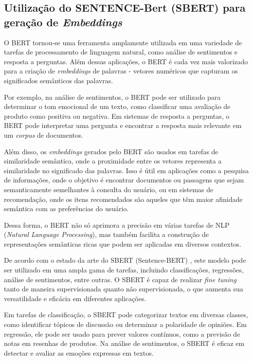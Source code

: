 \subsection{Utilização do SENTENCE-Bert (SBERT) para geração de \textit{Embeddings}}

O BERT tornou-se uma ferramenta amplamente utilizada em uma variedade de tarefas de processamento de linguagem natural, como análise de sentimentos e resposta a perguntas. Além dessas aplicações, o BERT é cada vez mais valorizado para a criação de \textit{embeddings} de palavras - vetores numéricos que capturam os significados semânticos das palavras.

Por exemplo, na análise de sentimentos, o BERT pode ser utilizado para determinar o tom emocional de um texto, como classificar uma avaliação de produto como positiva ou negativa. Em sistemas de resposta a perguntas, o BERT pode interpretar uma pergunta e encontrar a resposta mais relevante em um \textit{corpus} de documentos.

Além disso, os \textit{embeddings} gerados pelo BERT são usados em tarefas de similaridade semântica, onde a proximidade entre os vetores representa a similaridade no significado das palavras. Isso é útil em aplicações como a pesquisa de informações, onde o objetivo é encontrar documentos ou passagens que sejam semanticamente semelhantes à consulta do usuário, ou em sistemas de recomendação, onde os itens recomendados são aqueles que têm maior afinidade semântica com as preferências do usuário.

Dessa forma, o BERT não só aprimora a precisão em várias tarefas de NLP (\textit{Natural Language Processing}), mas também facilita a construção de representações semânticas ricas que podem ser aplicadas em diversos contextos.

De acordo com o estado da arte do SBERT (Sentence-BERT) \cite{reimers2019sentencebertsentenceembeddingsusing}, este modelo pode ser utilizado em uma ampla gama de tarefas, incluindo classificações, regressões, análise de sentimentos, entre outras. O SBERT é capaz de realizar \textit{fine tuning} tanto de maneira supervisionada quanto não supervisionada, o que aumenta sua versatilidade e eficácia em diferentes aplicações.

Em tarefas de classificação, o SBERT pode categorizar textos em diversas classes, como identificar tópicos de discussão ou determinar a polaridade de opiniões. Em regressão, ele pode ser usado para prever valores contínuos, como a previsão de notas em resenhas de produtos. Na análise de sentimentos, o SBERT é eficaz em detectar e avaliar as emoções expressas em textos.

